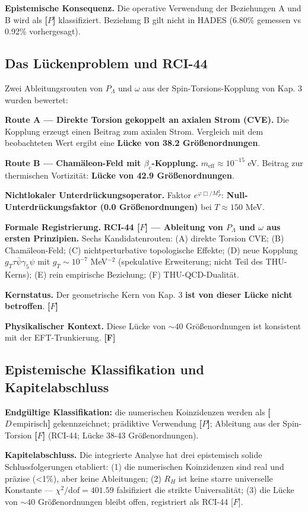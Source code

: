 ﻿\documentclass[11pt,letterpaper]{article}
\begin{document}
\textbf{Epistemische Konsequenz.} Die operative Verwendung der Beziehungen A und B wird als \textbf{[$P$]} klassifiziert. Beziehung B gilt nicht in HADES (6.80\% gemessen vs 0.92\% vorhergesagt).
\subsection{Das Lückenproblem und RCI-44}
Zwei Ableitungsrouten von $P_\Lambda$ und $\omega$ aus der Spin-Torsions-Kopplung von Kap. 3 wurden bewertet:

\textbf{Route A — Direkte Torsion gekoppelt an axialen Strom (CVE).} Die Kopplung erzeugt einen Beitrag zum axialen Strom. Vergleich mit dem beobachteten Wert ergibt eine \textbf{Lücke von 38.2 Größenordnungen}.

\textbf{Route B — Chamäleon-Feld mit $\beta_c$-Kopplung.} $m_{\text{eff}} \approx 10^{-15}$ eV. Beitrag zur thermischen Vortizität: \textbf{Lücke von 42.9 Größenordnungen}.

\textbf{Nichtlokaler Unterdrückungsoperator.} Faktor $e^{\varphi \Box / M_P^2}$: \textbf{Null-Unterdrückungsfaktor (0.0 Größenordnungen)} bei $T \approx 150$ MeV.

\textbf{Formale Registrierung.} \textbf{RCI-44 [$F$] — Ableitung von $P_\Lambda$ und $\omega$ aus ersten Prinzipien.} Sechs Kandidatenrouten: (A) direkte Torsion CVE; (B) Chamäleon-Feld; (C) nichtperturbative topologische Effekte; (D) neue Kopplung $g_T \tau\bar{\psi}\gamma_5\psi$ mit $g_T \sim 10^{-7}$ MeV$^{-2}$ (spekulative Erweiterung; nicht Teil des THU-Kerns); (E) rein empirische Beziehung; (F) THU-QCD-Dualität.

\textbf{Kernstatus.} Der geometrische Kern von Kap. 3 \textbf{ist von dieser Lücke nicht betroffen}. \textbf{[$F$]}

\textbf{Physikalischer Kontext.} Diese Lücke von $\sim 40$ Größenordnungen ist konsistent mit der EFT-Trunkierung. \textbf{[F]}
\subsection{Epistemische Klassifikation und Kapitelabschluss}
\textbf{Endgültige Klassifikation:} die numerischen Koinzidenzen werden als \textbf{[$D\,\text{empirisch}$]} gekennzeichnet; prädiktive Verwendung \textbf{[$P$]}; Ableitung aus der Spin-Torsion \textbf{[$F$]} (RCI-44; Lücke 38-43 Größenordnungen).

\textbf{Kapitelabschluss.} Die integrierte Analyse hat drei epistemisch solide Schlussfolgerungen etabliert: (1) die numerischen Koinzidenzen sind real und präzise (<1\%), aber keine Ableitungen; (2) $R_H$ ist keine starre universelle Konstante — $\chi^2/\mathrm{dof} = 401.59$ falsifiziert die strikte Universalität; (3) die Lücke von $\sim 40$ Größenordnungen bleibt offen, registriert als RCI-44 [$F$].
\end{document}
